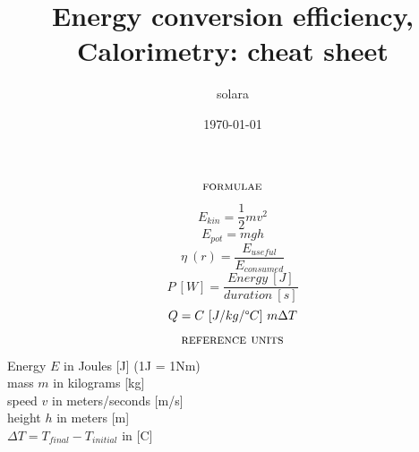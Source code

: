 \documentclass[11pt]{article}
\title{Energy conversion efficiency, Calorimetry: cheat sheet}
\author{solara}
\date{\today}
\begin{document}
  \maketitle

  $$\textsc{formulae}$$

  $$E_{kin} = \frac{1}{2}m v^2$$
  $$E_{pot} = mgh$$
  $$\eta\ (r) = \frac{E_{useful}}{E_{consumed}} $$
  $$P\ [W] = \frac{Energy\ [J]}{duration\ [s]}$$
  $$Q=C\ [J/kg/\degree C]\ m\Delta T$$

  $$\textsc{reference units}$$

  \begin{center}
    Energy $E$ in Joules [J] (1J = 1Nm) \\
    mass $m$ in kilograms [kg] \\
    speed $v$ in meters/seconds [m/s] \\
    height $h$ in meters [m] \\
    $\Delta T = T_{final}-T_{initial}$ in [\degree C]
  \end{center}
\end{document}
